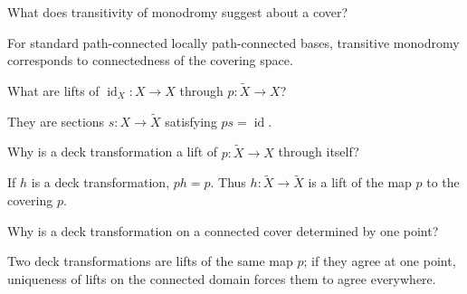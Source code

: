 \begin{problem}\label{prob:viii11-19}
What does transitivity of monodromy suggest about a cover?
\end{problem}
\begin{solution}
For standard path-connected locally path-connected bases, transitive monodromy corresponds to connectedness of the covering space.
\end{solution}

\begin{problem}\label{prob:viii11-20}
What are lifts of \(\operatorname{id}_X:X\to X\) through \(p:\widetilde X\to X\)?
\end{problem}
\begin{solution}
They are sections \(s:X\to\widetilde X\) satisfying \(ps=\operatorname{id}\).
\end{solution}

\begin{problem}\label{prob:viii11-21}
Why is a deck transformation a lift of \(p:\widetilde X\to X\) through itself?
\end{problem}
\begin{solution}
If \(h\) is a deck transformation, \(ph=p\). Thus \(h:\widetilde X\to\widetilde X\) is a lift of the map \(p\) to the covering \(p\).
\end{solution}

\begin{problem}\label{prob:viii11-22}
Why is a deck transformation on a connected cover determined by one point?
\end{problem}
\begin{solution}
Two deck transformations are lifts of the same map \(p\); if they agree at one point, uniqueness of lifts on the connected domain forces them to agree everywhere.
\end{solution}
